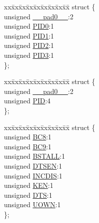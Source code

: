 \begin{DoxyCompactItemize}
\begin{tabbing}
\end{tabbing}\item 
\begin{tabbing}
xx\=xx\=xx\=xx\=xx\=xx\=xx\=xx\=xx\=\kill
struct \{\\
\>unsigned \hyperlink{union___b_d___s_t_a_t_adf71f3d8410c1f1dbbc96680a92c49af}{\_\_pad0\_\_}:2\\
\>unsigned \hyperlink{union___b_d___s_t_a_t_a810a2f6d15fc42c5d1e610b6e927d2eb}{PID0}:1\\
\>unsigned \hyperlink{union___b_d___s_t_a_t_acefd8c6eba334031c18cd877dfe08bfb}{PID1}:1\\
\>unsigned \hyperlink{union___b_d___s_t_a_t_aef3d6a9445a3c61d870212360c0a6110}{PID2}:1\\
\>unsigned \hyperlink{union___b_d___s_t_a_t_a771971768126aebea428ac7194b17fc0}{PID3}:1\\
\}; \\

\end{tabbing}\item 
\begin{tabbing}
xx\=xx\=xx\=xx\=xx\=xx\=xx\=xx\=xx\=\kill
struct \{\\
\>unsigned \hyperlink{union___b_d___s_t_a_t_adf71f3d8410c1f1dbbc96680a92c49af}{\_\_pad0\_\_}:2\\
\>unsigned \hyperlink{union___b_d___s_t_a_t_a97b41b25e06fd7857dcc6217c160a8ad}{PID}:4\\
\}; \\

\end{tabbing}\item 
\begin{tabbing}
xx\=xx\=xx\=xx\=xx\=xx\=xx\=xx\=xx\=\kill
struct \{\\
\>unsigned \hyperlink{union___b_d___s_t_a_t_a5d5010d284e6c86702a4ce3063f4cca5}{BC8}:1\\
\>unsigned \hyperlink{union___b_d___s_t_a_t_af499c0fe1fd8eba827eb024bf69841e9}{BC9}:1\\
\>unsigned \hyperlink{union___b_d___s_t_a_t_a145ee75f12c62d2a89097d18477019f2}{BSTALL}:1\\
\>unsigned \hyperlink{union___b_d___s_t_a_t_adeff6f5de2d8ca0cfa956560288c3541}{DTSEN}:1\\
\>unsigned \hyperlink{union___b_d___s_t_a_t_a39604d4252cc3e5f9551bd2cd3b54584}{INCDIS}:1\\
\>unsigned \hyperlink{union___b_d___s_t_a_t_aaf39e9ac8929e7da9cb427f1b0de0934}{KEN}:1\\
\>unsigned \hyperlink{union___b_d___s_t_a_t_a74db087bfe32cd33c459191f7a4aeb13}{DTS}:1\\
\>unsigned \hyperlink{union___b_d___s_t_a_t_abc982c28d59f8e36dbcb06639010169d}{UOWN}:1\\
\}; \\


\end{tabbing}
\end{DoxyCompactItemize}
